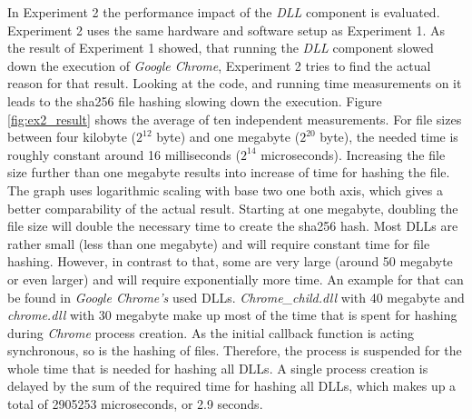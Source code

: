 In Experiment 2 the performance impact of the \emph{\gls{DLL}} component is evaluated. Experiment 2 uses the same hardware and software setup as Experiment 1. As the result of Experiment 1 showed, that running the \emph{\gls{DLL}} component slowed down the execution of \emph{Google Chrome}, Experiment 2 tries to find the actual reason for that result. Looking at the code, and running time measurements on it leads to the sha256 file hashing slowing down the execution. Figure \ref{fig:ex2_result} shows the average of ten independent measurements. For file sizes between four kilobyte ($2^{12}$ byte) and one megabyte ($2^{20}$ byte), the needed time is roughly constant around 16 milliseconds ($2^{14}$ microseconds). Increasing the file size further than one megabyte results into increase of time for hashing the file. The graph uses logarithmic scaling with base two one both axis, which gives a better comparability of the actual result. Starting at one megabyte, doubling the file size will double the necessary time to create the sha256 hash. Most \glspl{DLL} are rather small (less than one megabyte) and will require constant time for file hashing. However, in contrast to that, some are very large (around 50 megabyte or even larger) and will require exponentially more time. An example for that can be found in \emph{Google Chrome's} used \glspl{DLL}. \emph{Chrome\_child.dll} with 40 megabyte and \emph{chrome.dll} with 30 megabyte make up most of the time that is spent for hashing during \emph{Chrome} process creation. As the initial callback function  is acting synchronous, so is the hashing of files. Therefore, the process is suspended for the whole time that is needed for hashing all \glspl{DLL}. A single process creation is delayed by the sum of the required time for hashing all \glspl{DLL}, which makes up a total of 2905253 microseconds, or 2.9 seconds.

